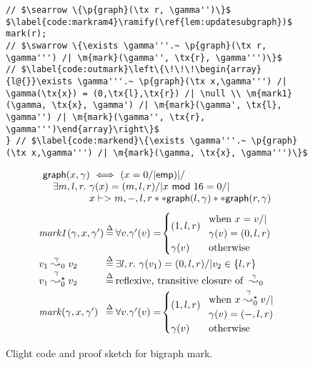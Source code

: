 \begin{figure}[htbp]
\begin{lstlisting}
// $\searrow \{\p{graph}(\tx r, \gamma'')\}$
$\label{code:markram4}\ramify(\ref{lem:updatesubgraph})$      mark(r);
// $\swarrow \{\exists \gamma'''.~ \p{graph}(\tx r, \gamma''') /| \m{mark}(\gamma'', \tx{r}, \gamma''')\}$
// $\label{code:outmark}\left\{\!\!\!\begin{array}{l@{}}\exists \gamma'''.~ \p{graph}(\tx x,\gamma''') /| \gamma(\tx{x}) = (0,\tx{l},\tx{r}) /| \null \\ \m{mark1}(\gamma, \tx{x}, \gamma') /| \m{mark}(\gamma', \tx{l}, \gamma'') /| \m{mark}(\gamma'', \tx{r}, \gamma''')\end{array}\right\}$
} // $\label{code:markend}\{\exists \gamma'''.~ \p{graph}(\tx x,\gamma''') /| \m{mark}(\gamma, \tx{x}, \gamma''')\}$
\end{lstlisting}
\begin{equation}
\label{eqn:bigraphintrofoldunfold}
\begin{array}{@{}l@{}}
\p{graph}(x, \gamma) ~ <=> ~ (x = 0 /| \p{emp}) |/ \null \\
\quad \exists m,l,r.~ \gamma(x)=(m,l,r) /| x~\mathsf{mod}~16 = 0 /| \null \\
\quad \qquad \quad ~~ x |-> m,-,l,r ** \p{graph}(l, \gamma) ** \p{graph}(r, \gamma)
\end{array}
\end{equation}
\[
\begin{array}{l@{\hspace{2pt}}c@{\hspace{2pt}}l}
\m{mark1}(\gamma,x,\gamma') & \defeq & \forall v. \gamma'(v) = \! \begin{cases}
(1,l,r) \! & \begin{array}{@{}l@{}}\text{when } x = v /| \null \\ \gamma(v) = (0,l,r) \end{array} \\
\gamma(v) & \text{otherwise}
\end{cases} \\
v_1 \mathrel{{\stackrel{\gamma~}{\leadsto_{0}}}} v_2 & \defeq & \exists l,r.~ \gamma(v_1) = (0,l,r) /| v_2 \in \{l,r\} \\
v_1 \mathrel{{\stackrel{\gamma~}{\leadsto^{\star}_{0}}}} v_2 & \defeq & \text{reflexive, transitive closure of }\mathrel{{\stackrel{\gamma}{\leadsto}}_{0}} \\
[2pt]
\m{mark}(\gamma,x,\gamma') & \defeq &
\forall v. \gamma'(v) = \! \begin{cases}
(1,l,r) \! & \begin{array}{@{}l@{}}\text{when } x \mathrel{\stackrel{\gamma~}{\leadsto^{\star}_{0}}} v /| \null \\ \gamma(v) = (-,l,r) \end{array}\\
\gamma(v) & \text{otherwise}
\end{cases}
\end{array}
\]
\vspace{-0.4em}
\caption{Clight code and proof sketch for bigraph mark.}
\label{fig:markgraph}
\vspace{-1em}
\end{figure}


